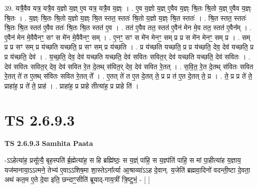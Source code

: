 \documentclass[17pt]{extarticle}
\begin{document}
39. यत्रै॒वैव यत्र॒ यत्रै॒व य॒ज्ञो य॒ज्ञ् ए॒व यत्र॒ यत्रै॒व य॒ज्ञ्ः । . ए॒व य॒ज्ञो य॒ज्ञ् ए॒वैव य॒ज्ञ्ः श्रि॒तः श्रि॒तो य॒ज्ञ् ए॒वैव य॒ज्ञ्ः श्रि॒तः । . य॒ज्ञ्ः श्रि॒तः श्रि॒तो य॒ज्ञो य॒ज्ञ्ः श्रि॒त स्तत॒ स्ततः॑ श्रि॒तो य॒ज्ञो य॒ज्ञ्ः श्रि॒त स्ततः॑ । . श्रि॒त स्तत॒ स्ततः॑ श्रि॒तः श्रि॒त स्तत॑ ए॒वैव ततः॑ श्रि॒तः श्रि॒त स्तत॑ ए॒व । . तत॑ ए॒वैव तत॒ स्तत॑ ए॒वैन॑ मेन मे॒व तत॒ स्तत॑ ए॒वैन᳚म् । . ए॒वैन॑ मेन मे॒वैवैनꣳ॒॒ सꣳ स मे॑न मे॒वैवैनꣳ॒॒ सम् । . ए॒नꣳ॒॒ सꣳ स मे॑न मेनꣳ॒॒ सम् प्र प्र स मे॑न मेनꣳ॒॒ सम् प्र । . सम् प्र प्र सꣳ सम् प्र य॑च्छति यच्छति॒ प्र सꣳ सम् प्र य॑च्छति । . प्र य॑च्छति यच्छति॒ प्र प्र य॑च्छति॒ देव॒ देव॑ यच्छति॒ प्र प्र य॑च्छति॒ देव॑ । . य॒च्छ॒ति॒ देव॒ देव॑ यच्छति यच्छति॒ देव॑ सवितः सवित॒र् देव॑ यच्छति यच्छति॒ देव॑ सवितः । . देव॑ सवितः सवित॒र् देव॒ देव॑ सवित रे॒त दे॒तथ् स॑वित॒र् देव॒ देव॑ सवित रे॒तत् । . स॒वि॒त॒ रे॒त दे॒तथ् स॑वितः सवित रे॒तत् ते॑ त ए॒तथ् स॑वितः सवित रे॒तत् ते᳚ । . ए॒तत् ते॑ त ए॒त दे॒तत् ते॒ प्र प्र त॑ ए॒त दे॒तत् ते॒ प्र । . ते॒ प्र प्र ते॑ ते॒ प्राहा॑ह॒ प्र ते॑ ते॒ प्राह॑ । . प्राहा॑ह॒ प्र प्राहे तीत्या॑ह॒ प्र प्राहे ति॑ । \newline
\pagebreak
{}
\section*{ TS 2.6.9.3 }

\textbf{TS 2.6.9.3 } \newline
\textbf{Samhita Paata} \newline

-ऽऽहेत्या॑ह॒ प्रसू᳚त्यै॒ बृह॒स्पति॑ र्ब्र॒ह्मेत्या॑ह॒ स हि ब्रह्मि॑ष्ठः॒ स य॒ज्ञ्ं पा॑हि॒ स य॒ज्ञ्प॑तिं पाहि॒ स मां पा॒हीत्या॑ह य॒ज्ञाय॒ यज॑मानाया॒ऽऽत्मने॒ तेभ्य॑ ए॒वाऽऽशिष॒मा शा॒स्तेऽना᳚र्त्या आ॒श्राव्या॑ऽऽह दे॒वान्. य॒जेति॑ ब्रह्मवा॒दिनो॑ वदन्ती॒ष्टा दे॒वता॒ अथ॑ कत॒म ए॒ते दे॒वा इति॒ छन्दाꣳ॒॒सीति॑ ब्रूयाद्-गाय॒त्रीं त्रि॒ष्टुभं॒ - [  ] \newline
\end{document}
